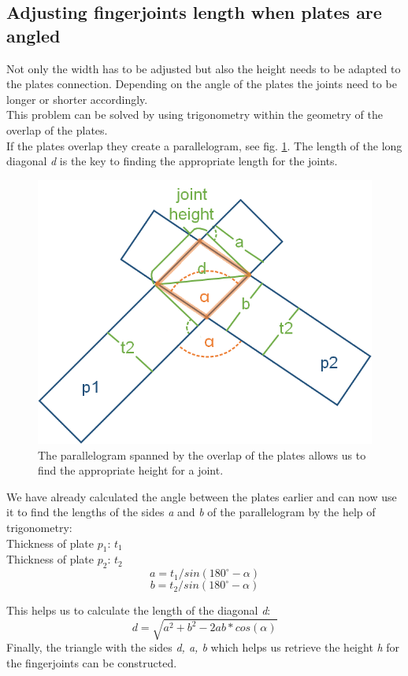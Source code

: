 \documentclass[../ClassicThesis.tex]{subfiles}
\begin{document}
\subsection{Adjusting fingerjoints length when plates are angled}
    Not only the width has to be adjusted but also the height needs to be adapted to the plates connection. Depending on the angle of the plates the joints need to be longer or shorter accordingly.\\
    This problem can be solved by using trigonometry within the geometry of the overlap of the plates.\\
    If the plates overlap they create a parallelogram, see fig. \ref{fig:newJointHeight}. The length of the long diagonal \emph{d} is the key to finding the appropriate length for the joints.
    \begin{figure}[!ht]
    \centering
    \includegraphics[width=0.5\columnwidth]{Images/06-2-joints-newJointHeight.png}
    \caption{The parallelogram spanned by the overlap of the plates allows us to find the appropriate height for a joint.}
    \label{fig:newJointHeight}
    \end{figure}
    
    We have already calculated the angle between the plates earlier and can now use it to find the lengths of the sides \emph{a} and \emph{b} of the parallelogram by the help of trigonometry:\\
    Thickness of plate $p_1$: $t_1$\\
    Thickness of plate $p_2$: $t_2$
    $$ a = t_1 / sin(180^{\circ} - \alpha)$$
    $$ b = t_2 / sin(180^{\circ} - \alpha)$$
    
    This helps us to calculate the length of the diagonal \emph{d}:
    $$ d = \sqrt{a^2 + b^2 - 2ab * cos(\alpha)}$$
    Finally, the triangle with the sides \emph{d, a, b} which helps us retrieve the height \emph{h} for the fingerjoints can be constructed. 
    
\end{document}
